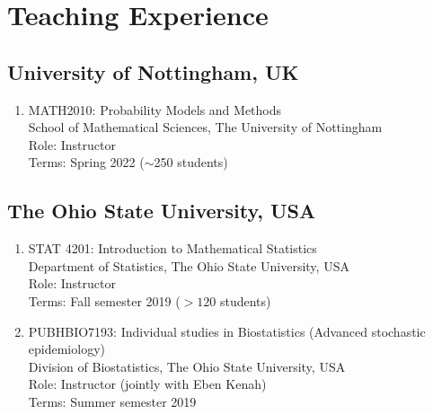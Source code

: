 \documentclass[11pt,a4paper,sans]{moderncv}        %
\begin{document}
\section{Teaching Experience}
\subsection{University of Nottingham, UK}
\begin{enumerate}
	\item MATH2010: Probability Models and Methods\\School of Mathematical Sciences, The University of Nottingham\\Role: Instructor\\Terms: Spring 2022 ($\sim$250 students)
\end{enumerate}

\subsection{The Ohio State University, USA}
\begin{enumerate}
	\item STAT 4201: Introduction to Mathematical Statistics\\Department of Statistics, The Ohio State University, USA\\Role: Instructor\\Terms: Fall semester 2019 ($>120$ students)
	\item PUBHBIO7193: Individual studies in Biostatistics (Advanced stochastic epidemiology)\\Division of Biostatistics, The Ohio State University, USA\\Role: Instructor (jointly with Eben Kenah)\\Terms: Summer semester 2019
\end{enumerate}
\end{document}
